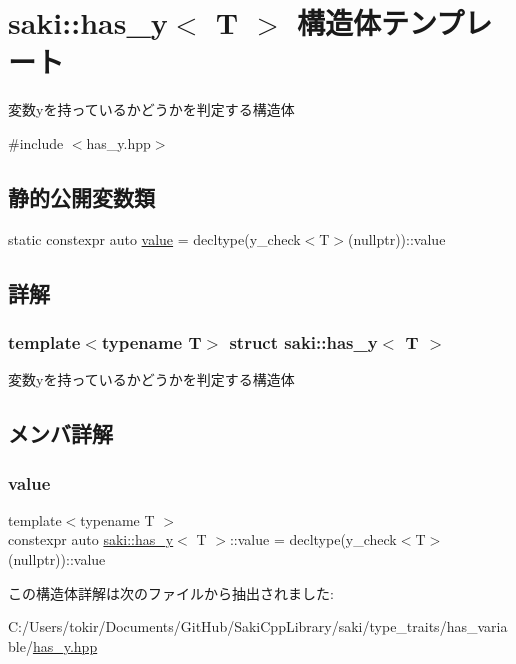 \hypertarget{structsaki_1_1has__y}{}\section{saki\+:\+:has\+\_\+y$<$ T $>$ 構造体テンプレート}
\label{structsaki_1_1has__y}


変数yを持っているかどうかを判定する構造体  




{\ttfamily \#include $<$has\+\_\+y.\+hpp$>$}

\subsection*{静的公開変数類}
\begin{DoxyCompactItemize}
\item 
static constexpr auto \mbox{\hyperlink{structsaki_1_1has__y_aa7f43916663394a6d3b07295be5cc1ee}{value}} = decltype(y\+\_\+check$<$T$>$(nullptr))\+::value
\end{DoxyCompactItemize}


\subsection{詳解}
\subsubsection*{template$<$typename T$>$\newline
struct saki\+::has\+\_\+y$<$ T $>$}

変数yを持っているかどうかを判定する構造体 

\subsection{メンバ詳解}
\mbox{\label{structsaki_1_1has__y_aa7f43916663394a6d3b07295be5cc1ee}} 
\subsubsection{\texorpdfstring{value}{value}}
{\footnotesize\ttfamily template$<$typename T $>$ \\
constexpr auto \mbox{\hyperlink{structsaki_1_1has__y}{saki\+::has\+\_\+y}}$<$ T $>$\+::value = decltype(y\+\_\+check$<$T$>$(nullptr))\+::value\hspace{0.3cm}{\ttfamily [static]}}



この構造体詳解は次のファイルから抽出されました\+:\begin{DoxyCompactItemize}
\item 
C\+:/\+Users/tokir/\+Documents/\+Git\+Hub/\+Saki\+Cpp\+Library/saki/type\+\_\+traits/has\+\_\+variable/\mbox{\hyperlink{has__y_8hpp}{has\+\_\+y.\+hpp}}\end{DoxyCompactItemize}
